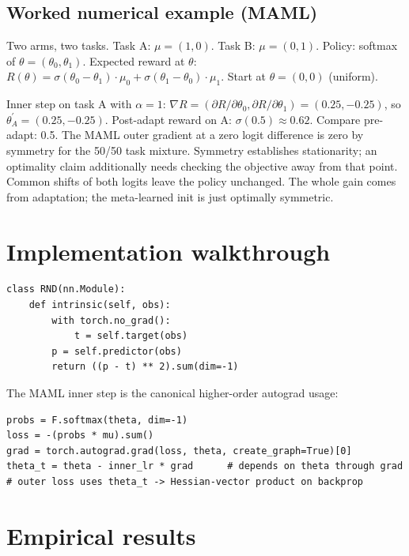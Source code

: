 \documentclass[11pt,oneside]{scrbook}
\begin{document}
\section{Worked numerical example (MAML)}

Two arms, two tasks. Task A: $\mu = (1, 0)$. Task B: $\mu = (0, 1)$. Policy: softmax of $\theta = (\theta_0, \theta_1)$. Expected reward at $\theta$: $R(\theta) = \sigma(\theta_0 - \theta_1) \cdot \mu_0 + \sigma(\theta_1 - \theta_0) \cdot \mu_1$. Start at $\theta = (0, 0)$ (uniform).

Inner step on task A with $\alpha = 1$: $\nabla R = (\partial R / \partial \theta_0, \partial R / \partial \theta_1) = (0.25, -0.25)$, so $\theta^\prime_A = (0.25, -0.25)$. Post-adapt reward on A: $\sigma(0.5) \approx 0.62$. Compare pre-adapt: 0.5. The MAML outer gradient at a zero logit difference is zero by symmetry for the 50/50 task mixture. Symmetry establishes stationarity; an optimality claim additionally needs checking the objective away from that point. Common shifts of both logits leave the policy unchanged. The whole gain comes from adaptation; the meta-learned init is just optimally symmetric.

\chapter{Implementation walkthrough}

\begin{codebox}
\begin{verbatim}
class RND(nn.Module):
    def intrinsic(self, obs):
        with torch.no_grad():
            t = self.target(obs)
        p = self.predictor(obs)
        return ((p - t) ** 2).sum(dim=-1)
\end{verbatim}
\end{codebox}

The MAML inner step is the canonical higher-order autograd usage:

\begin{codebox}
\begin{verbatim}
probs = F.softmax(theta, dim=-1)
loss = -(probs * mu).sum()
grad = torch.autograd.grad(loss, theta, create_graph=True)[0]
theta_t = theta - inner_lr * grad      # depends on theta through grad
# outer loss uses theta_t -> Hessian-vector product on backprop
\end{verbatim}
\end{codebox}

\chapter{Empirical results}
\end{document}
